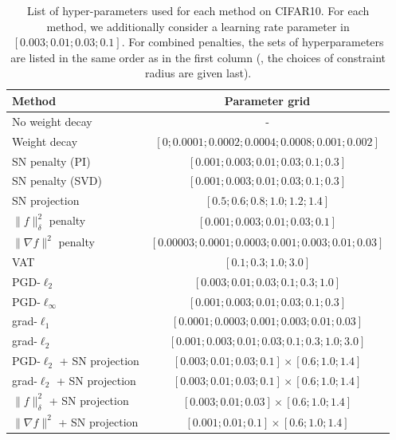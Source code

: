 \begin{table}[h]
\caption{List of hyper-parameters used for each method on CIFAR10.
For each method, we additionally consider a learning rate parameter in $[0.003 ; 0.01 ; 0.03 ; 0.1]$.
For combined penalties, the sets of hyperparameters are listed in the same order as in the first column
(\ie, the choices of constraint radius are given last).}
\centering
\small
\vspace{0.2cm}
\label{tab:smalldata_param_grid}
\begin{tabular}{ | l | c |  }
\hline
Method & Parameter grid \\ \hline
\hline
No weight decay &  -   \\ \hline
Weight decay &  $[0; 0.0001 ; 0.0002 ; 0.0004 ; 0.0008 ; 0.001 ; 0.002]$   \\ \hline
SN penalty (PI) &  $[0.001 ; 0.003 ; 0.01 ; 0.03 ; 0.1 ; 0.3]$ \\ \hline
SN penalty (SVD) &  $[0.001 ; 0.003 ; 0.01 ; 0.03 ; 0.1 ; 0.3]$  \\ \hline
SN projection &  $[0.5 ; 0.6 ; 0.8 ; 1.0 ; 1.2 ; 1.4]$  \\ \hline
$\|f\|_\delta^2$ penalty & $[0.001 ; 0.003 ; 0.01 ; 0.03 ; 0.1]$  \\ \hline
$\|\nabla f\|^2$ penalty & $[0.00003 ; 0.0001 ; 0.0003 ; 0.001 ; 0.003 ; 0.01 ; 0.03]$ \\ \hline
VAT & $[0.1 ; 0.3 ; 1.0 ; 3.0]$ \\ \hline
PGD-$\ell_2$ &  $[0.003 ; 0.01 ; 0.03 ; 0.1 ; 0.3 ; 1.0]$ \\ \hline
PGD-$\ell_\infty$ &  $[0.001 ; 0.003 ; 0.01 ; 0.03 ; 0.1 ; 0.3]$  \\ \hline
grad-$\ell_1$ &  $[0.0001 ; 0.0003 ; 0.001 ; 0.003 ; 0.01 ; 0.03]$  \\ \hline
grad-$\ell_2$ &  $[0.001 ; 0.003 ; 0.01 ; 0.03 ; 0.1 ; 0.3 ; 1.0 ; 3.0]$ \\ \hline
PGD-$\ell_2$ + SN projection &  $ [0.003 ; 0.01 ; 0.03 ; 0.1] \times [0.6 ; 1.0 ; 1.4]$   \\ \hline
grad-$\ell_2$ + SN projection & $ [0.003 ; 0.01 ; 0.03 ; 0.1] \times [0.6 ; 1.0 ; 1.4]$  \\ \hline
$\|f\|_\delta^2$ + SN projection & $ [0.003 ; 0.01 ; 0.03] \times [0.6 ; 1.0 ; 1.4]$    \\ \hline
$\|\nabla f\|^2$ + SN projection & $ [0.001 ; 0.01 ; 0.1] \times [0.6 ; 1.0 ; 1.4]$   \\ \hline
\end{tabular}
\end{table}

